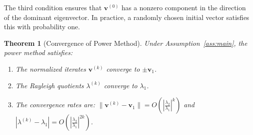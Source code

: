 \documentclass[11pt,a4paper]{article}
\newtheorem{theorem}{Theorem}
\begin{document}
The third condition ensures that $\mathbf{v}^{(0)}$ has a nonzero component in the direction of the dominant eigenvector. In practice, a randomly chosen initial vector satisfies this with probability one.

\begin{theorem}[Convergence of Power Method]\label{thm:convergence}
Under Assumption~\ref{ass:main}, the power method satisfies:
\begin{enumerate}
    \item The normalized iterates $\mathbf{v}^{(k)}$ converge to $\pm \mathbf{v}_1$.
    \item The Rayleigh quotients $\lambda^{(k)}$ converge to $\lambda_1$.
    \item The convergence rates are: $\|\mathbf{v}^{(k)} - \mathbf{v}_1\| = O\left(\left|\frac{\lambda_2}{\lambda_1}\right|^k\right)$ and $|\lambda^{(k)} - \lambda_1| = O\left(\left|\frac{\lambda_2}{\lambda_1}\right|^{2k}\right)$.
\end{enumerate}
\end{theorem}
\end{document}
